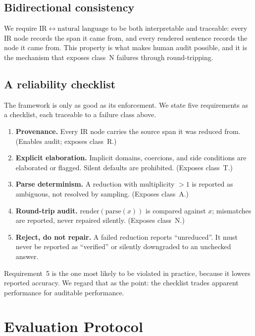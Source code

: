 \documentclass[11pt,a4paper]{article}
\begin{document}
\subsection{Bidirectional consistency}
We require $\mathrm{IR} \leftrightarrow \text{natural language}$ to be both
interpretable and traceable: every IR node records the span it came from, and
every rendered sentence records the node it came from.  This property is what
makes human audit possible, and it is the mechanism that exposes class~N
failures through round-tripping.

\subsection{A reliability checklist}
\label{sec:checklist}
The framework is only as good as its enforcement.  We state five requirements
as a checklist, each traceable to a failure class above.

\begin{enumerate}
  \item \textbf{Provenance.}  Every IR node carries the source span it was
        reduced from.  (Enables audit; exposes class~R.)
  \item \textbf{Explicit elaboration.}  Implicit domains, coercions, and side
        conditions are elaborated or flagged.  Silent defaults are prohibited.
        (Exposes class~T.)
  \item \textbf{Parse determinism.}  A reduction with multiplicity $>1$ is
        reported as ambiguous, not resolved by sampling.  (Exposes class~A.)
  \item \textbf{Round-trip audit.}  $\mathrm{render}(\mathrm{parse}(x))$ is
        compared against $x$; mismatches are reported, never repaired silently.
        (Exposes class~N.)
  \item \textbf{Reject, do not repair.}  A failed reduction reports
        ``unreduced''.  It must never be reported as ``verified'' or silently
        downgraded to an unchecked answer.
\end{enumerate}

Requirement~5 is the one most likely to be violated in practice, because it
lowers reported accuracy.  We regard that as the point: the checklist trades
apparent performance for auditable performance.

\section{Evaluation Protocol}
\label{sec:protocol}
\end{document}
